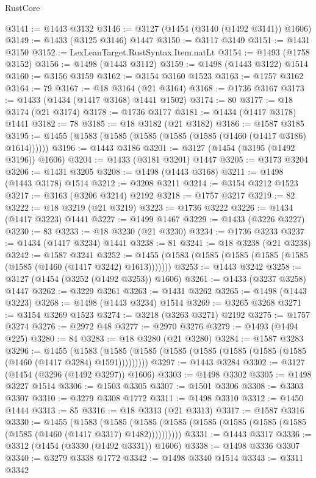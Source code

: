 \begin{lexlean}{RustCore}
\begin{coremodule}
@3141 := @1443 @3132
@3146 := @3127 (@1454 (@3140 (@1492 @3141)) @1606)
@3149 := @1433 (@3125 @3146) @1447
@3150 := @3117 @3149
@3151 := @1431 @3150
@3152 := LexLeanTarget.RustSyntax.Item.natLt
@3154 := @1493 (@1758 @3152)
@3156 := @1498 (@1443 @3112)
@3159 := @1498 (@1443 @3122) @1514
@3160 := @3156 @3159
@3162 := @3154 @3160 @1523
@3163 := @1757 @3162
@3164 := 79
@3167 := @18 @3164 (@21 @3164)
@3168 := @1736 @3167
@3173 := @1433 (@1434 (@1417 @3168) @1441 @1502)
@3174 := 80
@3177 := @18 @3174 (@21 @3174)
@3178 := @1736 @3177
@3181 := @1434 (@1417 @3178) @1441
@3182 := 78
@3185 := @18 @3182 (@21 @3182)
@3186 := @1587 @3185
@3195 := @1455 (@1583 (@1585 (@1585 (@1585 (@1585 (@1460 (@1417 @3186) @1614))))))
@3196 := @1443 @3186
@3201 := @3127 (@1454 (@3195 (@1492 @3196)) @1606)
@3204 := @1433 (@3181 @3201) @1447
@3205 := @3173 @3204
@3206 := @1431 @3205
@3208 := @1498 (@1443 @3168)
@3211 := @1498 (@1443 @3178) @1514
@3212 := @3208 @3211
@3214 := @3154 @3212 @1523
@3217 := @3163 (@3206 @3214) @2192
@3218 := @1757 @3217
@3219 := 82
@3222 := @18 @3219 (@21 @3219)
@3223 := @1736 @3222
@3226 := @1434 (@1417 @3223) @1441
@3227 := @1499 @1467
@3229 := @1433 (@3226 @3227)
@3230 := 83
@3233 := @18 @3230 (@21 @3230)
@3234 := @1736 @3233
@3237 := @1434 (@1417 @3234) @1441
@3238 := 81
@3241 := @18 @3238 (@21 @3238)
@3242 := @1587 @3241
@3252 := @1455 (@1583 (@1585 (@1585 (@1585 (@1585 (@1585 (@1460 (@1417 @3242) @1613)))))))
@3253 := @1443 @3242
@3258 := @3127 (@1454 (@3252 (@1492 @3253)) @1606)
@3261 := @1433 (@3237 @3258) @1447
@3262 := @3229 @3261
@3263 := @1431 @3262
@3265 := @1498 (@1443 @3223)
@3268 := @1498 (@1443 @3234) @1514
@3269 := @3265 @3268
@3271 := @3154 @3269 @1523
@3274 := @3218 (@3263 @3271) @2192
@3275 := @1757 @3274
@3276 := @2972 @48
@3277 := @2970 @3276
@3279 := @1493 (@1494 @225)
@3280 := 84
@3283 := @18 @3280 (@21 @3280)
@3284 := @1587 @3283
@3296 := @1455
    (@1583 (@1585 (@1585 (@1585 (@1585 (@1585 (@1585 (@1585 (@1460 (@1417 @3284) @1591)))))))))
@3297 := @1443 @3284
@3302 := @3127 (@1454 (@3296 (@1492 @3297)) @1606)
@3303 := @1498 @3302
@3305 := @1498 @3227 @1514
@3306 := @1503 @3305
@3307 := @1501 @3306
@3308 := @3303 @3307
@3310 := @3279 @3308 @1772
@3311 := @1498 @3310
@3312 := @1450 @1444
@3313 := 85
@3316 := @18 @3313 (@21 @3313)
@3317 := @1587 @3316
@3330 := @1455
    (@1583
      (@1585 (@1585 (@1585 (@1585 (@1585 (@1585 (@1585 (@1585 (@1460 (@1417 @3317) @1482))))))))))
@3331 := @1443 @3317
@3336 := @3312 (@1454 (@3330 (@1492 @3331)) @1606)
@3338 := @1498 @3336 @3307
@3340 := @3279 @3338 @1772
@3342 := @1498 @3340 @1514
@3343 := @3311 @3342

\end{coremodule}
\end{lexlean}
